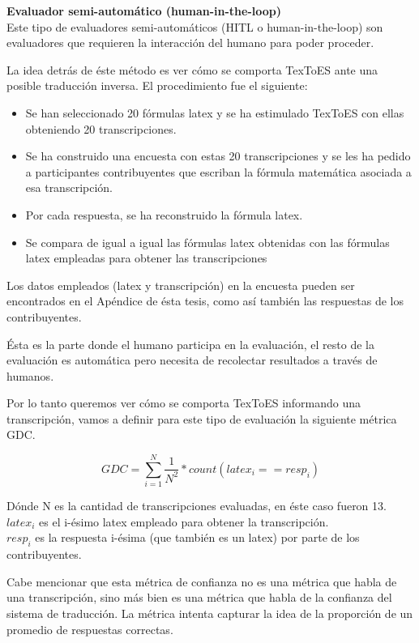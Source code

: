 {\Large \textbf{Evaluador semi-automático (human-in-the-loop)}}\\

Este tipo de evaluadores semi-automáticos (HITL o human-in-the-loop) son evaluadores que requieren la interacción del humano para poder proceder.

La idea detrás de éste método es ver cómo se comporta TexToES ante una posible traducción inversa. El procedimiento fue el siguiente:

\begin{itemize}
   \item Se han seleccionado 20 fórmulas latex y se ha estimulado TexToES con ellas obteniendo 20 transcripciones.
   \item Se ha construido una encuesta con estas 20 transcripciones y se les ha pedido a participantes contribuyentes que escriban la fórmula matemática asociada a esa transcripción.
   \item Por cada respuesta, se ha reconstruido la fórmula latex.
   \item Se compara de igual a igual las fórmulas latex obtenidas con las fórmulas latex empleadas para obtener las transcripciones
\end{itemize}

Los datos empleados (latex y transcripción) en la encuesta pueden ser encontrados en el Apéndice de ésta tesis, como así también las respuestas de los contribuyentes.

Ésta es la parte donde el humano participa en la evaluación, el resto de la evaluación es automática pero necesita de recolectar resultados a través de humanos.

Por lo tanto queremos ver cómo se comporta TexToES informando una transcripción, vamos a definir para este tipo de evaluación la siguiente métrica GDC.

$$GDC = \sum_{i=1}^{N} \frac{1}{N^2}*count(latex_i==resp_i)$$

Dónde N es la cantidad de transcripciones evaluadas, en éste caso fueron 13.\\
$latex_i$ es el i-ésimo latex empleado para obtener la transcripción.\\
$resp_i$ es la respuesta i-ésima (que también es un latex) por parte de los contribuyentes.

Cabe mencionar que esta métrica de confianza no es una métrica que habla de una transcripción, sino más bien es una métrica que habla de la confianza del sistema de traducción. La métrica intenta capturar la idea de la proporción de un promedio de respuestas correctas.\\

